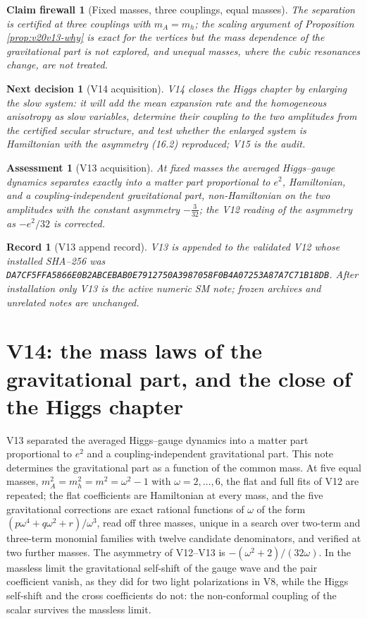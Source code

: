 \documentclass[11pt]{article}
\newtheorem{firewall}[theorem]{Claim firewall}
\newtheorem{decision}[theorem]{Next decision}
\newtheorem{assessment}[theorem]{Assessment}
\newtheorem{record}[theorem]{Record}
\theoremstyle{remark}
\begin{document}
\begin{firewall}[Fixed masses, three couplings, equal masses]
\label{fire:v20v13}
The separation is certified at three couplings with \(m_A=m_h\); the
scaling argument of Proposition \ref{prop:v20v13-why} is exact for the
vertices but the mass dependence of the gravitational part is not
explored, and unequal masses, where the cubic resonances change, are
not treated.
\end{firewall}

\begin{decision}[V14 acquisition]
\label{dec:v20v13-next}
V14 closes the Higgs chapter by enlarging the slow system: it will
add the mean expansion rate and the homogeneous anisotropy as slow
variables, determine their coupling to the two amplitudes from the
certified secular structure, and test whether the enlarged system is
Hamiltonian with the asymmetry (16.2) reproduced; V15 is the audit.
\end{decision}

\begin{assessment}[V13 acquisition]
\label{ass:v20v13}
At fixed masses the averaged Higgs--gauge dynamics separates exactly
into a matter part proportional to \(e^2\), Hamiltonian, and a
coupling-independent gravitational part, non-Hamiltonian on the two
amplitudes with the constant asymmetry \(-\tfrac3{32}\); the V12
reading of the asymmetry as \(-e^2/32\) is corrected.
\end{assessment}

\begin{record}[V13 append record]
\label{rec:v20v13}
V13 is appended to the validated V12 whose installed SHA--256 was
\texttt{DA7CF5FFA5866E0B2ABCEBAB0E7912750A3987058F0B4A07253A87A7C71B18DB}.
After installation only V13 is the active numeric SM note; frozen
archives and unrelated notes are unchanged.
\end{record}


\section{V14: the mass laws of the gravitational part, and the close of the Higgs chapter}
\label{sec:v20v14}

V13 separated the averaged Higgs--gauge dynamics into a matter part
proportional to \(e^2\) and a coupling-independent gravitational part.
This note determines the gravitational part as a function of the
common mass.  At five equal masses, \(m_A^2=m_h^2=m^2=\omega^2-1\) with
\(\omega=2,\dots,6\), the flat and full fits of V12 are repeated; the
flat coefficients are Hamiltonian at every mass, and the five
gravitational corrections are exact rational functions of \(\omega\)
of the form \((p\omega^4+q\omega^2+r)/\omega^3\), read off three masses,
unique in a search over two-term and three-term monomial families
with twelve candidate denominators, and verified at two further
masses.  The asymmetry of V12--V13 is
\(-(\omega^2+2)/(32\omega)\).  In the massless limit the gravitational
self-shift of the gauge wave and the pair coefficient vanish, as they
did for two light polarizations in V8, while the Higgs self-shift and
the cross coefficients do not: the non-conformal coupling of the
scalar survives the massless limit.
\end{document}
